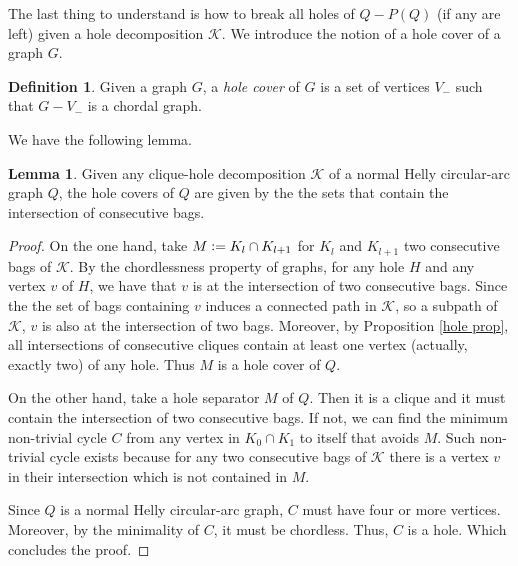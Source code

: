 \documentclass{article}
\theoremstyle{definition}
\newtheorem{lemma}[thm]{Lemma}
\newtheorem{defn}[thm]{Definition}
\newcommand{\defeq}{\vcentcolon=}
\begin{document}
    The last thing to
    understand is how to break
    all holes of $Q - P\left(Q\right)$
    (if any are left)
    given a hole decomposition $\mathcal{K}$.
    We introduce the notion of a
    hole cover of a graph $G$. 

    \begin{defn}
        Given a graph $G$,
        a \emph{hole cover} of
        $G$ is a set of vertices $V_{-}$ 
        such that $G - V_{-}$ is a
        chordal graph.
    \end{defn}

    We have the following lemma.
    
    \begin{lemma}
        Given any clique-hole decomposition
        $\mathcal{K}$ of a normal Helly
        circular-arc graph $Q$, the hole
        covers of $Q$ are given by the
        the sets that contain the intersection
        of consecutive bags.
    \end{lemma}
    \begin{proof}
        On the one hand, take $M \defeq K_{l} \cap K_{l+1}$ 
        for $K_{l}$ and $K_{l+1}$ two consecutive
        bags of $\mathcal{K}$. 
        By the chordlessness property
        of graphs, for any hole $H$ and
        any vertex $v$ of $H$, we have
        that 
        $v$ is at the intersection of
        two consecutive bags.
        Since the the set of bags
        containing $v$ induces a
        connected path in $\mathcal{K}$,
        so a subpath of $\mathcal{K}$,
        $v$ is also at the
        intersection of two bags.
        Moreover,
        by Proposition \ref{hole prop},
        all intersections of consecutive
        cliques contain at least one vertex
        (actually, exactly two) of
        any hole.
        Thus $M$ is a hole cover of $Q$.

        On the other hand, take a hole separator
        $M$ of $Q$. Then it is a
        clique and it must contain
        the intersection of two consecutive bags.
        If not, we can find the minimum non-trivial
        cycle $C$ from any vertex in $K_0 \cap K_1$
        to itself that avoids $M$. Such non-trivial
        cycle exists because for any two consecutive
        bags of $\mathcal{K}$ there is a vertex $v$ 
        in their intersection which is not 
        contained in $M$.

        Since $Q$ is a normal Helly circular-arc
        graph, $C$ must have four or more vertices.
        Moreover, by the minimality of $C$, it must be chordless.
        Thus, $C$ is a hole.
        Which concludes the proof.
    \end{proof}
    
\end{document}
